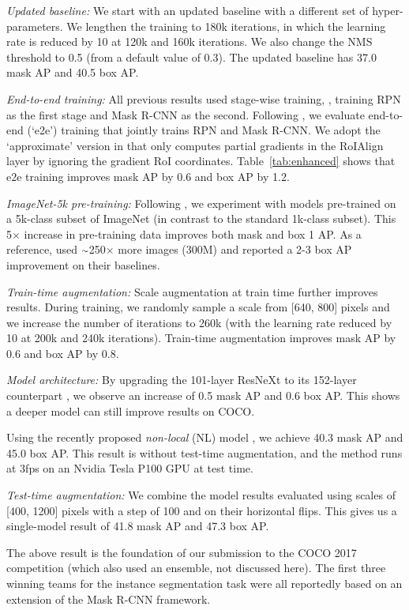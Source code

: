 \documentclass[10pt,twocolumn,letterpaper]{article}
\newcommand{\app}{\raise.17ex\hbox{$\scriptstyle\sim$}}
\begin{document}
\textit{Updated baseline:} We start with an updated baseline with a different set of hyper-parameters. We lengthen the training to 180k iterations, in which the learning rate is reduced by 10 at 120k and 160k iterations. We also change the NMS threshold to 0.5 (from a default value of 0.3). The updated baseline has 37.0 mask AP and 40.5 box AP.

\textit{End-to-end training:} All previous results used stage-wise training, \ie, training RPN as the first stage and Mask R-CNN as the second. Following \cite{Ren2017}, we evaluate end-to-end (`e2e') training that jointly trains RPN and Mask R-CNN. We adopt the `approximate' version in \cite{Ren2017} that only computes partial gradients in the RoIAlign layer by ignoring the gradient \wrt RoI coordinates. Table~\ref{tab:enhanced} shows that e2e training improves mask AP by 0.6 and box AP by 1.2.

\textit{ImageNet-5k pre-training:} Following \cite{Xie2017}, we experiment with models pre-trained on a 5k-class subset of ImageNet (in contrast to the standard 1k-class subset). This 5$\times$ increase in pre-training data improves both mask and box 1 AP. As a reference, \cite{Sun2017} used $\app$250$\times$ more images (300M) and reported a 2-3 box AP improvement on their baselines.

\textit{Train-time augmentation:} Scale augmentation at train time further improves results. During training, we randomly sample a scale from [640, 800] pixels and we increase the number of iterations to 260k (with the learning rate reduced by 10 at 200k and 240k iterations). Train-time augmentation improves mask AP by 0.6 and box AP by 0.8.

\textit{Model architecture:} By upgrading the 101-layer ResNeXt to its 152-layer counterpart \cite{He2016}, we observe an increase of 0.5 mask AP and 0.6 box AP. This shows a deeper model can still improve results on COCO.

Using the recently proposed \emph{non-local} (NL) model \cite{Wang2017}, we achieve 40.3 mask AP and 45.0 box AP. This result is without test-time augmentation, and the method runs at 3fps on an Nvidia Tesla P100 GPU at test time.

\textit{Test-time augmentation:} We combine the model results evaluated using scales of [400, 1200] pixels with a step of 100 and on their horizontal flips. This gives us a single-model result of 41.8 mask AP and 47.3 box AP.

The above result is the foundation of our submission to the COCO 2017 competition (which also used an ensemble, not discussed here). The first three winning teams for the instance segmentation task were all reportedly based on an extension of the Mask R-CNN framework.
\end{document}
